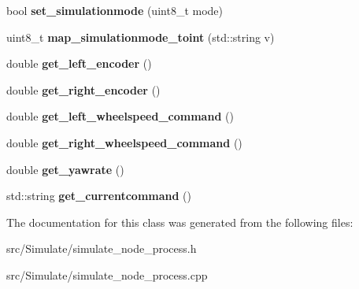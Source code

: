 \begin{DoxyCompactItemize}
\item 
\mbox{\label{classSimulateNodeProcess_a268a698e374c793b006b1842d0b36d70}} 
bool {\bfseries set\+\_\+simulationmode} (uint8\+\_\+t mode)
\item 
\mbox{\label{classSimulateNodeProcess_a950a973e0b4ca47384f83a14ad79f321}} 
uint8\+\_\+t {\bfseries map\+\_\+simulationmode\+\_\+toint} (std\+::string v)
\item 
\mbox{\label{classSimulateNodeProcess_a11a41ad1c17567c495eff7f244aa3eb3}} 
double {\bfseries get\+\_\+left\+\_\+encoder} ()
\item 
\mbox{\label{classSimulateNodeProcess_a978bbab90d97f75a2e01d068ef666f34}} 
double {\bfseries get\+\_\+right\+\_\+encoder} ()
\item 
\mbox{\label{classSimulateNodeProcess_a3dae921a0913b76d896968208405f145}} 
double {\bfseries get\+\_\+left\+\_\+wheelspeed\+\_\+command} ()
\item 
\mbox{\label{classSimulateNodeProcess_af986225221cad99825b8e24222c7b098}} 
double {\bfseries get\+\_\+right\+\_\+wheelspeed\+\_\+command} ()
\item 
\mbox{\label{classSimulateNodeProcess_acfd9a06cbd7ef632c0dedd679f847ebd}} 
double {\bfseries get\+\_\+yawrate} ()
\item 
\mbox{\label{classSimulateNodeProcess_a3d0c5eb2c3aef40920b09fcb9d9120a0}} 
std\+::string {\bfseries get\+\_\+currentcommand} ()
\end{DoxyCompactItemize}


The documentation for this class was generated from the following files\+:\begin{DoxyCompactItemize}
\item 
src/\+Simulate/simulate\+\_\+node\+\_\+process.\+h\item 
src/\+Simulate/simulate\+\_\+node\+\_\+process.\+cpp\end{DoxyCompactItemize}
